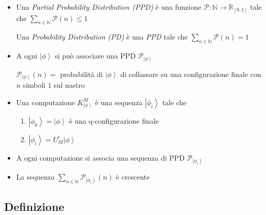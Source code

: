 \documentclass{beamer}
\begin{document}
\begin{frame}{\secname}{\subsecname}
	\begin{itemize}
		\item Una \textit{Partial Probability Distribution (PPD)} è una funzione \( \mathcal{P} : \mathbb{N} \rightarrow \mathbb{R}_{[0,1]} \) tale che \( \sum_{n \in \mathbb{N}} \mathcal{P} \left ( n \right ) \le 1 \)\par
		Una \textit{Probability Distribution (PD)} è una \textit{PPD} tale che \( \sum_{n \in \mathbb{N}} \mathcal{P} \left ( n \right ) = 1 \)
		\item A ogni \( \left | \phi \right \rangle \) si può associare una PPD \( \mathcal{P}_{\left | \phi \right \rangle} \)\par
		\( \mathcal{P}_{\left | \phi \right \rangle} \left ( n \right ) = \) probabilità di \( \left | \phi \right \rangle \) di collassare su una configurazione finale con \(n\) simboli \(1\) sul nastro 
	\end{itemize}
\end{frame}

\begin{frame}{\secname}{\subsecname}
	\begin{itemize}
		\item Una computazione \(K^{M}_{\left | \phi \right \rangle}\) è una sequenza \(\left | \phi_{i} \right \rangle\) tale che
		\begin{enumerate}
			\item \(\left | \phi_{0} \right \rangle = \left | \phi \right \rangle\) è una q-configurazione finale
			\item \(\left | \phi_{i} \right \rangle = U_{M}^{i}\left | \phi \right \rangle\)
		\end{enumerate}
		\item A ogni computazione si associa una sequenza di PPD \( \mathcal{P}_{\left | \phi_{i} \right \rangle} \)
		\item La sequenza \(\sum_{n \in \mathbb{N}} \mathcal{P}_{\left | \phi_{i} \right \rangle} \left ( n \right )\) è crescente
	\end{itemize}
\end{frame}

\subsection{Definizione}
\end{document}
